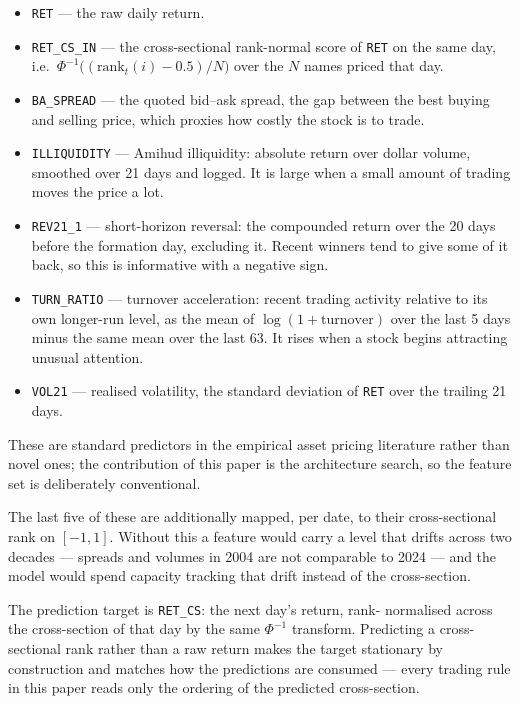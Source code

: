 \begin{itemize}\itemsep2pt
\item \texttt{RET} --- the raw daily return.
\item \texttt{RET\_CS\_IN} --- the cross-sectional rank-normal score of
      \texttt{RET} on the same day, i.e.\ $\Phi^{-1}\!\big((\mathrm{rank}_t(i)-0.5)/N\big)$
      over the $N$ names priced that day.
\item \texttt{BA\_SPREAD} --- the quoted bid--ask spread, the gap between
      the best buying and selling price, which proxies how costly the
      stock is to trade.
\item \texttt{ILLIQUIDITY} --- Amihud illiquidity: absolute return over
      dollar volume, smoothed over 21 days and logged. It is large when
      a small amount of trading moves the price a lot.
\item \texttt{REV21\_1} --- short-horizon reversal: the compounded return
      over the 20 days before the formation day, excluding it. Recent
      winners tend to give some of it back, so this is informative with
      a negative sign.
\item \texttt{TURN\_RATIO} --- turnover acceleration: recent trading
      activity relative to its own longer-run level, as the mean of
      $\log(1+\mathrm{turnover})$ over the last 5 days minus the same
      mean over the last 63. It rises when a stock begins attracting
      unusual attention.
\item \texttt{VOL21} --- realised volatility, the standard deviation of
      \texttt{RET} over the trailing 21 days.
\end{itemize}

These are standard predictors in the empirical asset pricing literature
rather than novel ones; the contribution of this paper is the
architecture search, so the feature set is deliberately conventional.

The last five of these are additionally mapped, per date, to their
cross-sectional rank on $[-1,1]$. Without this a feature would carry a
level that drifts across two decades --- spreads and volumes in 2004 are
not comparable to 2024 --- and the model would spend capacity tracking
that drift instead of the cross-section.

The prediction target is \texttt{RET\_CS}: the next day's return, rank-
normalised across the cross-section of that day by the same $\Phi^{-1}$
transform. Predicting a cross-sectional rank rather than a raw return
makes the target stationary by construction and matches how the
predictions are consumed --- every trading rule in this paper reads only
the ordering of the predicted cross-section.

